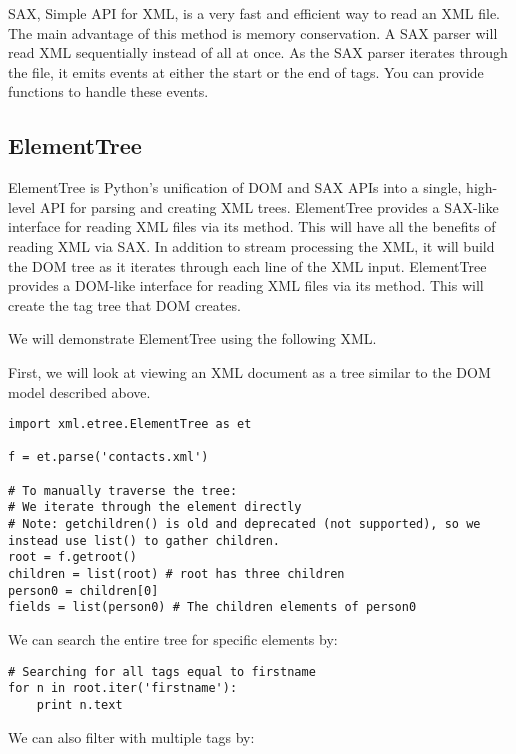 SAX, Simple API for XML, is a very fast and efficient way to read an XML file.
The main advantage of this method is memory conservation.
A SAX parser will read XML sequentially instead of all at once.
As the SAX parser iterates through the file, it emits events at either the start or the end of tags.
You can provide functions to handle these events.

\subsection*{ElementTree} %

ElementTree is Python's unification of DOM and SAX APIs into a single, high-level API for parsing and creating XML trees.
ElementTree provides a SAX-like interface for reading XML files via its  method.
This will have all the benefits of reading XML via SAX.
In addition to stream processing the XML, it will build the DOM tree as it iterates through each line of the XML input.
ElementTree provides a DOM-like interface for reading XML files via its  method.
This will create the tag tree that DOM creates.

We will demonstrate ElementTree using the following XML.


First, we will look at viewing an XML document as a tree similar to the DOM model described above.

\begin{lstlisting}
import xml.etree.ElementTree as et

f = et.parse('contacts.xml')

# To manually traverse the tree:
# We iterate through the element directly
# Note: getchildren() is old and deprecated (not supported), so we instead use list() to gather children.
root = f.getroot()
children = list(root) # root has three children
person0 = children[0]
fields = list(person0) # The children elements of person0
\end{lstlisting}

We can search the entire tree for specific elements by:

\begin{lstlisting}
# Searching for all tags equal to firstname
for n in root.iter('firstname'):
    print n.text
\end{lstlisting}

We can also filter with multiple tags by:

